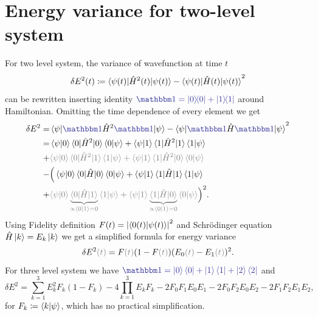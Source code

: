 \section{Energy variance for two-level system}
For two level system, the variance of wavefunction at time $t$
\begin{equation}
    \delta E^2(t)\coloneqq \braket{\psi(t)|\hat{H}^2(t)|\psi(t)}-\braket{\psi(t)|\hat{H}(t)|\psi(t)}^2
\end{equation}
can be rewritten inserting identity $\bluee{\Id=\ket{0}\!\!\bra{0}+\ket{1}\!\!\bra{1}}$ around Hamiltonian. Omitting the time dependence of every element we get
\begin{equation}
    \begin{split}
        \delta E^2 =& \braket{\psi|\bluee{\Id}\HH^2\bluee{\Id}|\psi}-\braket{\psi|\bluee{\Id}\HH\bluee{\Id}|\psi}^2\\
        =&\braket{\psi|0}\braket{0|\HH^2|0}\braket{0|\psi}+\braket{\psi|1}\braket{1|\HH^2|1}\braket{1|\psi}\\
        +&\textcolor{gray}{\braket{\psi|0}\braket{0|\HH^2|1}\braket{1|\psi}+\braket{\psi|1}\braket{1|\HH^2|0}\braket{0|\psi}}\\
        -&\Big(\braket{\psi|0}\braket{0|\HH|0}\braket{0|\psi}+\braket{\psi|1}\braket{1|\HH|1}\braket{1|\psi}\\
        +&\textcolor{gray}{\braket{\psi|0}\underbrace{\braket{0|\HH|1}}_{\propto \braket{0|1}=0}\braket{1|\psi}+\braket{\psi|1}\underbrace{\braket{1|\HH|0}}_{\propto \braket{0|1}=0}\braket{0|\psi}}\Big)^2.
    \end{split}
\end{equation}
Using Fidelity definition $F(t)=\left|\braket{0(t)|\psi(t)}\right|^2$ and Schr\"odinger equation $\hat{H}\ket{k}=E_k\ket{k}$ we get a simplified formula for energy variance
\begin{equation}
    \delta E^2\gray{(t)} = F\gray{(t)}(1-F\gray{(t)})(E_0\gray{(t)}-E_1\gray{(t)})^2.
\end{equation}
For three level system we have $\bluee{\Id=\ket{0}\bra{0}+\ket{1}\bra{1}+\ket{2}\bra{2}}$ and
\begin{equation}
    \delta E^2=\sum_{k=1}^3 E_k^2 F_k(1-F_k)-4\prod_{k=1}^3 E_kF_k-2F_0F_1E_0E_1-2F_0F_2E_0E_2-2F_1F_2E_1E_2,
\end{equation}
for $F_k\coloneqq \braket{k|\psi}$, which has no practical simplification.











